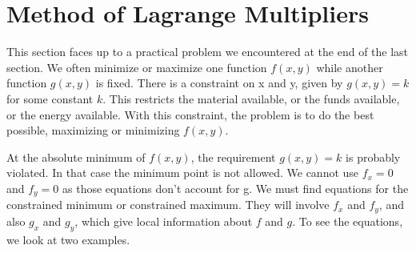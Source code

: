 \section{Method of Lagrange Multipliers}\label{sec:lagrange_multipliers}

This section faces up to a practical problem we encountered at the end of the last section. We often minimize or maximize one function $f(x, y)$ while another function $g(x, y)$ is fixed. There is a constraint on x and y, given by $g(x, y) = k$ for some constant $k$. This restricts the material available, or the funds available, or the energy available. With this constraint, the problem is to do the best possible, maximizing or minimizing $f(x,y)$.

At the absolute minimum of $f(x, y)$, the requirement $g(x, y) = k$ is probably violated.
In that case the minimum point is not allowed. We cannot use $f_x = 0$ and $f_y = 0$ as
those equations don't account for g. We must find equations for the constrained minimum or constrained maximum. They will involve $f_x$ and $f_y$, and also $g_x$ and $g_y$, which give local information about $f$ and $g$. To see the equations, we look at two examples.\\

